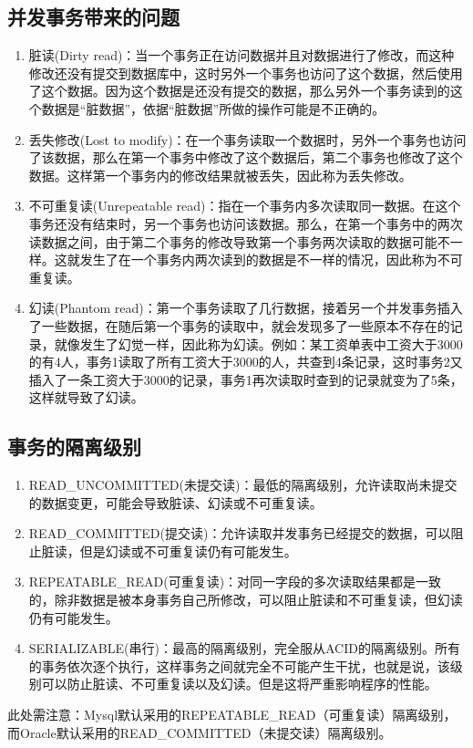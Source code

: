 \documentclass[main.tex]{subfiles}
\begin{document}
\subsection{并发事务带来的问题}
\begin{enumerate}
    \item 脏读(Dirty read)：当一个事务正在访问数据并且对数据进行了修改，而这种修改还没有提交到数据库中，这时另外一个事务也访问了这个数据，然后使用了这个数据。因为这个数据是还没有提交的数据，那么另外一个事务读到的这个数据是“脏数据”，依据“脏数据”所做的操作可能是不正确的。
    \item 丢失修改(Lost to modify)：在一个事务读取一个数据时，另外一个事务也访问了该数据，那么在第一个事务中修改了这个数据后，第二个事务也修改了这个数据。这样第一个事务内的修改结果就被丢失，因此称为丢失修改。
    \item 不可重复读(Unrepeatable read)：指在一个事务内多次读取同一数据。在这个事务还没有结束时，另一个事务也访问该数据。那么，在第一个事务中的两次读数据之间，由于第二个事务的修改导致第一个事务两次读取的数据可能不一样。这就发生了在一个事务内两次读到的数据是不一样的情况，因此称为不可重复读。
    \item 幻读(Phantom read)：第一个事务读取了几行数据，接着另一个并发事务插入了一些数据，在随后第一个事务的读取中，就会发现多了一些原本不存在的记录，就像发生了幻觉一样，因此称为幻读。例如：某工资单表中工资大于3000的有4人，事务1读取了所有工资大于3000的人，共查到4条记录，这时事务2又插入了一条工资大于3000的记录，事务1再次读取时查到的记录就变为了5条，这样就导致了幻读。
\end{enumerate}

\subsection{事务的隔离级别}
\begin{enumerate}
    \item READ\_UNCOMMITTED(未提交读)：最低的隔离级别，允许读取尚未提交的数据变更，可能会导致脏读、幻读或不可重复读。
    \item READ\_COMMITTED(提交读)：允许读取并发事务已经提交的数据，可以阻止脏读，但是幻读或不可重复读仍有可能发生。
    \item REPEATABLE\_READ(可重复读)：对同一字段的多次读取结果都是一致的，除非数据是被本身事务自己所修改，可以阻止脏读和不可重复读，但幻读仍有可能发生。
    \item SERIALIZABLE(串行)：最高的隔离级别，完全服从ACID的隔离级别。所有的事务依次逐个执行，这样事务之间就完全不可能产生干扰，也就是说，该级别可以防止脏读、不可重复读以及幻读。但是这将严重影响程序的性能。
\end{enumerate}
此处需注意：Mysql默认采用的REPEATABLE\_READ（可重复读）隔离级别，而Oracle默认采用的READ\_COMMITTED（未提交读）隔离级别。
\end{document}
